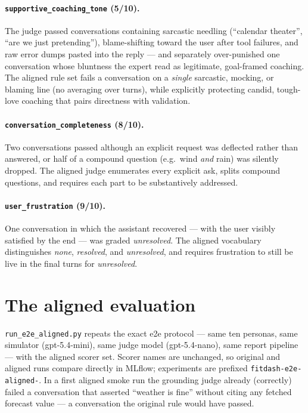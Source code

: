 \documentclass[11pt,a4paper]{article}
\newcommand{\scorer}[1]{\texttt{\small #1}}
\begin{document}
\paragraph{\scorer{supportive\_coaching\_tone} (5/10).} The judge passed
conversations containing sarcastic needling (``calendar theater'', ``are we
just pretending''), blame-shifting toward the user after tool failures, and raw
error dumps pasted into the reply --- and separately over-punished one
conversation whose bluntness the expert read as legitimate, goal-framed
coaching. The aligned rule set fails a conversation on a \emph{single}
sarcastic, mocking, or blaming line (no averaging over turns), while explicitly
protecting candid, tough-love coaching that pairs directness with validation.

\paragraph{\scorer{conversation\_completeness} (8/10).} Two conversations
passed although an explicit request was deflected rather than answered, or half
of a compound question (e.g.\ wind \emph{and} rain) was silently dropped. The
aligned judge enumerates every explicit ask, splits compound questions, and
requires each part to be substantively addressed.

\paragraph{\scorer{user\_frustration} (9/10).} One conversation in which the
assistant recovered --- with the user visibly satisfied by the end --- was
graded \emph{unresolved}. The aligned vocabulary distinguishes \emph{none},
\emph{resolved}, and \emph{unresolved}, and requires frustration to still be
live in the final turns for \emph{unresolved}.

\section{The aligned evaluation}

\texttt{run\_e2e\_aligned.py} repeats the exact e2e protocol --- same ten
personas, same simulator (gpt-5.4-mini), same judge model (gpt-5.4-nano), same
report pipeline --- with the aligned scorer set. Scorer names are unchanged, so
original and aligned runs compare directly in MLflow; experiments are prefixed
\texttt{fitdash-e2e-aligned-}. In a first aligned smoke run the grounding judge
already (correctly) failed a conversation that asserted ``weather is fine''
without citing any fetched forecast value --- a conversation the original rule
would have passed.
\end{document}
